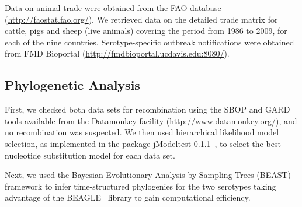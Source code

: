 \documentclass[10pt]{article}
\begin{document}
Data on animal trade were obtained from the FAO database (\url{http://faostat.fao.org/}).
We retrieved data on the detailed trade matrix for cattle, pigs and sheep (live animals) covering the period from 1986 to 2009, for each of the nine countries.
Serotype-specific outbreak notifications were obtained from FMD Bioportal (\url{http://fmdbioportal.ucdavis.edu:8080/}).

\subsection*{Phylogenetic Analysis}

First, we checked both data sets for recombination using the SBOP and GARD~\cite{sbpgard} tools available from the Datamonkey facility (\url{http://www.datamonkey.org/}), and no recombination was suspected.
We then used hierarchical likelihood model selection, as implemented in the package jModeltest 0.1.1~\cite{jmodel}, to select the best nucleotide substitution model for each data set.

Next, we used the Bayesian Evolutionary Analysis by Sampling Trees (BEAST)~\cite{beast2012} framework to infer time-structured phylogenies for the two serotypes taking advantage of the  BEAGLE~\cite{BEAGLE} library to gain computational efficiency.
\end{document}
